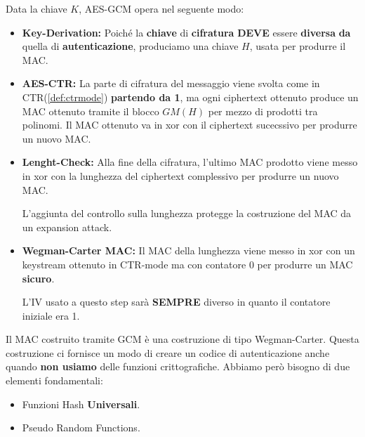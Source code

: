 \begin{definition}\label{def:aesgcm}
Data la chiave $K$, AES-GCM opera nel seguente modo:
\begin{itemize}
    \item \textbf{Key-Derivation:} Poiché la \textbf{chiave} di \textbf{cifratura} \textbf{DEVE} essere \textbf{diversa} \textbf{da} quella di \textbf{autenticazione}, produciamo una chiave $H$, usata per produrre il MAC.
    \item \textbf{AES-CTR:} La parte di cifratura del messaggio viene svolta come in CTR\footnotemark (\cref{def:ctrmode}) \textbf{partendo da 1}, ma ogni ciphertext ottenuto produce un MAC ottenuto tramite il blocco $GM(H)$ per mezzo di prodotti tra polinomi. Il MAC ottenuto va in xor con il ciphertext sucecssivo per produrre un nuovo MAC.
    \item \textbf{Lenght-Check:} Alla fine della cifratura, l'ultimo MAC prodotto viene messo in xor con la lunghezza del ciphertext complessivo per produrre un nuovo MAC. 
    \begin{note}
    L'aggiunta del controllo sulla lunghezza protegge la costruzione del MAC da un expansion attack.
    \end{note}
    \item \textbf{Wegman-Carter MAC:} Il MAC della lunghezza viene messo in xor con un keystream ottenuto in CTR-mode ma con contatore $0$ per produrre un MAC \textbf{sicuro}. 
    \begin{note}
    L'IV usato a questo step sarà \textbf{SEMPRE} diverso in quanto il contatore iniziale era 1. 
    \end{note}
\end{itemize}
\end{definition}
\begin{corollary}\label{cor:wegmancarter}

Il MAC costruito tramite GCM è una costruzione di tipo Wegman-Carter. Questa costruzione ci fornisce un modo di creare un codice di autenticazione anche quando \textbf{non usiamo} delle funzioni crittografiche. Abbiamo però bisogno di due elementi fondamentali:
\begin{itemize}
    \item Funzioni Hash \textbf{Universali}.
    \item Pseudo Random Functions.
\end{itemize}
\end{corollary}
